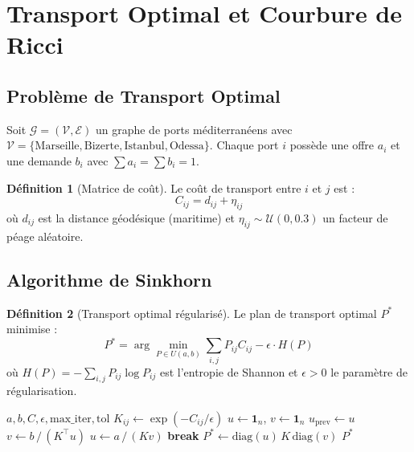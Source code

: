 \documentclass[11pt,a4paper]{article}
\theoremstyle{definition}
\newtheorem{definition}{Définition}[section]
\theoremstyle{remark}
\begin{document}
\section{Transport Optimal et Courbure de Ricci}
\label{sec:transport}

\subsection{Problème de Transport Optimal}

Soit $\mathcal{G} = (\mathcal{V}, \mathcal{E})$ un graphe de ports méditerranéens avec $\mathcal{V} = \{\text{Marseille}, \text{Bizerte}, \text{Istanbul}, \text{Odessa}\}$. Chaque port $i$ possède une offre $a_i$ et une demande $b_i$ avec $\sum a_i = \sum b_i = 1$.

\begin{definition}[Matrice de coût]
\label{def:cout}
Le coût de transport entre $i$ et $j$ est :
\begin{equation}
    C_{ij} = d_{ij} + \eta_{ij}
\end{equation}
où $d_{ij}$ est la distance géodésique (maritime) et $\eta_{ij} \sim \mathcal{U}(0, 0.3)$ un facteur de péage aléatoire.
\end{definition}

\subsection{Algorithme de Sinkhorn}

\begin{definition}[Transport optimal régularisé]
\label{def:sinkhorn}
Le plan de transport optimal $P^*$ minimise :
\begin{equation}
    \boxed{P^* = \arg\min_{P \in U(a,b)} \sum_{i,j} P_{ij} C_{ij} - \epsilon \cdot H(P)}
\end{equation}
où $H(P) = -\sum_{i,j} P_{ij} \log P_{ij}$ est l'entropie de Shannon et $\epsilon > 0$ le paramètre de régularisation.
\end{definition}

\begin{algorithm}[H]
\caption{Algorithme de Sinkhorn}
\label{alg:sinkhorn}
\begin{algorithmic}[1]
\Require $a, b, C, \epsilon, \text{max\_iter}, \text{tol}$
\State $K_{ij} \gets \exp(-C_{ij}/\epsilon)$
\State $u \gets \mathbf{1}_n$, $v \gets \mathbf{1}_n$
    \State $u_{\text{prev}} \gets u$
    \State $v \gets b \, / \, (K^\top u)$ 
    \State $u \gets a \, / \, (K v)$ 
        \State \textbf{break}
    \EndIf
\EndFor
\State $P^* \gets \text{diag}(u) \, K \, \text{diag}(v)$
\State \Return $P^*$
\end{algorithmic}
\end{algorithm}
\end{document}
